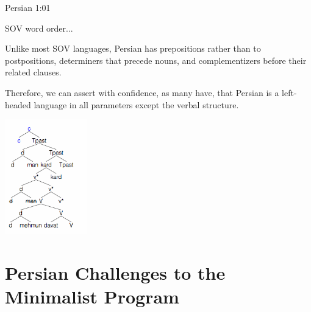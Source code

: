 \documentclass[10pt]{beamer}
\begin{document}
\begin{frame}[fragile]{Persian 1:01}

  SOV word order...
  \pause

  Unlike most SOV languages, Persian has prepositions rather than to postpositions, determiners that precede nouns, and complementizers before their related clauses. 
  \pause

  Therefore, we can assert with confidence, as many have, that Persian is a left-headed language in all parameters except the verbal structure. 

  \centerline{\includegraphics[height=5cm]{headedness.png}}


\end{frame}



\section{Persian Challenges to the Minimalist Program}
\end{document}
